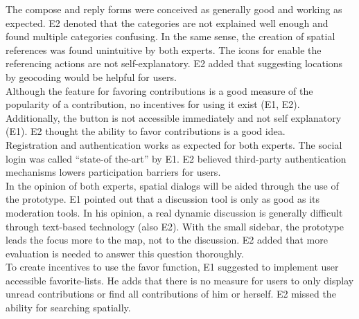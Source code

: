 The compose and reply forms were conceived as generally good and working as expected. E2 denoted that the categories are not explained well enough and found multiple categories confusing. In the same sense, the creation of spatial references was found unintuitive by both experts. The icons for enable the referencing actions are not self-explanatory. E2 added that suggesting locations by geocoding would be helpful for users.\\
Although the feature for favoring contributions is a good measure of the popularity of a contribution, no incentives for using it exist (E1, E2). Additionally, the button is not accessible immediately and not self explanatory (E1). E2 thought the ability to favor contributions is a good idea.\\
Registration and authentication works as expected for both experts. The social login was called ``state-of the-art'' by E1. E2 believed third-party authentication mechanisms lowers participation barriers for users.\\
In the opinion of both experts, spatial dialogs will be aided through the use of the prototype. E1 pointed out that a discussion tool is only as good as its moderation tools. In his opinion, a real dynamic discussion is generally difficult through text-based technology (also E2). With the small sidebar, the prototype leads the focus more to the map, not to the discussion. E2 added that more evaluation is needed to answer this question thoroughly.\\
To create incentives to use the favor function, E1 suggested to implement user accessible favorite-lists. He adds that there is no measure for users to only display unread contributions or find all contributions of him or herself. E2 missed the ability for searching spatially.\\


